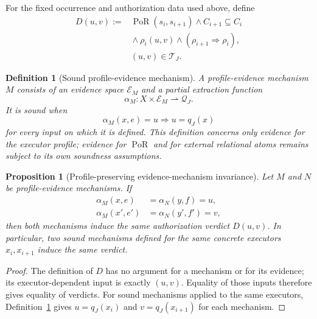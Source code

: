 \documentclass[10pt,twocolumn]{article}
\newcommand{\Profiles}{\mathcal{Q}}
\newcommand{\Transitions}{\mathcal{T}}
\newcommand{\PoR}{\operatorname{PoR}}
\newtheorem{definition}{Definition}
\newtheorem{proposition}{Proposition}
\begin{document}
For the fixed occurrence and authorization data used above, define
\[
\begin{aligned}
D(u,v):={}&
\PoR(s_i,s_{i+1})
\land C_{i+1}\subseteq C_i\\
&{}\land\rho_i(u,v)
\land(\rho_{i+1}\Rightarrow\rho_i),\\
&(u,v)\in\Transitions_J.
\end{aligned}
\]

\begin{definition}[Sound profile-evidence mechanism]\label{def:profile-evidence}
A profile-evidence mechanism \(M\) consists of an evidence space
\(\mathcal E_M\) and a partial extraction function
\[
\alpha_M:X\times\mathcal E_M\rightharpoonup\Profiles_J.
\]
It is sound when
\[
\alpha_M(x,e)=u\Longrightarrow u=q_J(x)
\]
for every input on which it is defined. This definition concerns only evidence
for the executor profile; evidence for \(\PoR\) and for external relational
atoms remains subject to its own soundness assumptions.
\end{definition}

\begin{proposition}[Profile-preserving evidence-mechanism invariance]
\label{prop:mechanism-invariance}
Let \(M\) and \(N\) be profile-evidence mechanisms. If
\[
\begin{aligned}
\alpha_M(x,e)&=\alpha_N(y,f)=u,\\
\alpha_M(x',e')&=\alpha_N(y',f')=v,
\end{aligned}
\]
then both mechanisms induce the same authorization verdict \(D(u,v)\). In
particular, two sound mechanisms defined for the same concrete executors
\(x_i,x_{i+1}\) induce the same verdict.
\end{proposition}

\begin{proof}
The definition of \(D\) has no argument for a mechanism or for its evidence;
its executor-dependent input is exactly \((u,v)\). Equality of those inputs
therefore gives equality of verdicts. For sound mechanisms applied to the same
executors, Definition~\ref{def:profile-evidence} gives
\(u=q_J(x_i)\) and \(v=q_J(x_{i+1})\) for each mechanism.
\end{proof}
\end{document}
